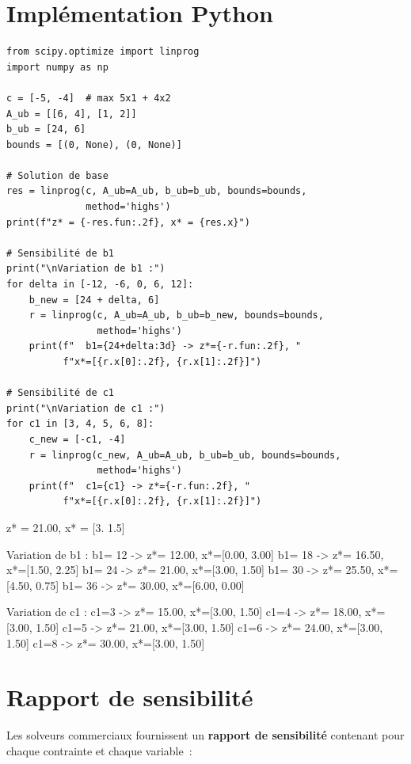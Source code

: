 \section{Impl\'ementation Python}

\begin{codeblock}[title=\textbf{Analyse de sensibilit\'e avec SciPy}]
\begin{verbatim}
from scipy.optimize import linprog
import numpy as np

c = [-5, -4]  # max 5x1 + 4x2
A_ub = [[6, 4], [1, 2]]
b_ub = [24, 6]
bounds = [(0, None), (0, None)]

# Solution de base
res = linprog(c, A_ub=A_ub, b_ub=b_ub, bounds=bounds,
              method='highs')
print(f"z* = {-res.fun:.2f}, x* = {res.x}")

# Sensibilité de b1
print("\nVariation de b1 :")
for delta in [-12, -6, 0, 6, 12]:
    b_new = [24 + delta, 6]
    r = linprog(c, A_ub=A_ub, b_ub=b_new, bounds=bounds,
                method='highs')
    print(f"  b1={24+delta:3d} -> z*={-r.fun:.2f}, "
          f"x*=[{r.x[0]:.2f}, {r.x[1]:.2f}]")

# Sensibilité de c1
print("\nVariation de c1 :")
for c1 in [3, 4, 5, 6, 8]:
    c_new = [-c1, -4]
    r = linprog(c_new, A_ub=A_ub, b_ub=b_ub, bounds=bounds,
                method='highs')
    print(f"  c1={c1} -> z*={-r.fun:.2f}, "
          f"x*=[{r.x[0]:.2f}, {r.x[1]:.2f}]")
\end{verbatim}
\end{codeblock}

\begin{codeoutput}
z* = 21.00, x* = [3.  1.5]

Variation de b1 :
  b1= 12 -> z*= 12.00, x*=[0.00, 3.00]
  b1= 18 -> z*= 16.50, x*=[1.50, 2.25]
  b1= 24 -> z*= 21.00, x*=[3.00, 1.50]
  b1= 30 -> z*= 25.50, x*=[4.50, 0.75]
  b1= 36 -> z*= 30.00, x*=[6.00, 0.00]

Variation de c1 :
  c1=3 -> z*= 15.00, x*=[3.00, 1.50]
  c1=4 -> z*= 18.00, x*=[3.00, 1.50]
  c1=5 -> z*= 21.00, x*=[3.00, 1.50]
  c1=6 -> z*= 24.00, x*=[3.00, 1.50]
  c1=8 -> z*= 30.00, x*=[3.00, 1.50]
\end{codeoutput}

\section{Rapport de sensibilit\'e}

Les solveurs commerciaux fournissent un \textbf{rapport de sensibilit\'e}
contenant pour chaque contrainte et chaque variable~:

